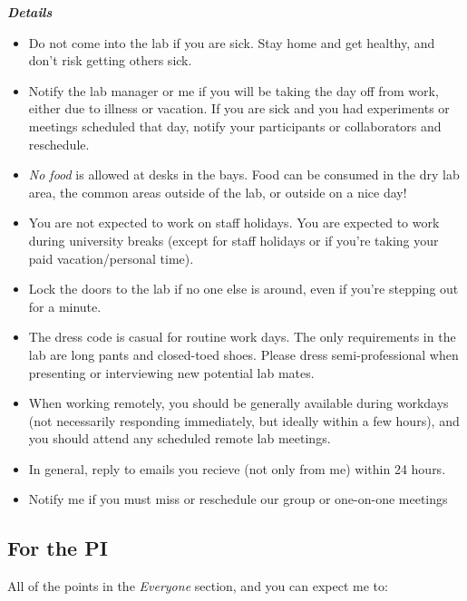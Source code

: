 \documentclass[
]{book}
\providecommand{\tightlist}{%
  \setlength{\itemsep}{0pt}\setlength{\parskip}{0pt}}
\begin{document}
\textbf{\emph{Details}}

\begin{itemize}
\tightlist
\item
  Do not come into the lab if you are sick. Stay home and get healthy, and don't risk getting others sick.
\item
  Notify the lab manager or me if you will be taking the day off from work, either due to illness or vacation. If you are sick and you had experiments or meetings scheduled that day, notify your participants or collaborators and reschedule.
\item
  \emph{No food} is allowed at desks in the bays. Food can be consumed in the dry lab area, the common areas outside of the lab, or outside on a nice day!
\item
  You are not expected to work on staff holidays. You are expected to work during university breaks (except for staff holidays or if you're taking your paid vacation/personal time).
\item
  Lock the doors to the lab if no one else is around, even if you're stepping out for a minute.
\item
  The dress code is casual for routine work days. The only requirements in the lab are long pants and closed-toed shoes. Please dress semi-professional when presenting or interviewing new potential lab mates.\\
\item
  When working remotely, you should be generally available during workdays (not necessarily responding immediately, but ideally within a few hours), and you should attend any scheduled remote lab meetings.
\item
  In general, reply to emails you recieve (not only from me) within 24 hours.
\item
  Notify me if you must miss or reschedule our group or one-on-one meetings
\end{itemize}

\hypertarget{for-the-pi}{%
\subsection{For the PI}\label{for-the-pi}}

All of the points in the \emph{Everyone} section, and you can expect me to:
\end{document}

